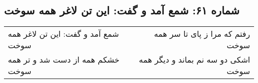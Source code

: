 \begin{center}
\section*{شماره ۶۱: شمع آمد و گفت: این تن لاغر همه سوخت}
\label{sec:061}
\begin{longtable}{l p{0.5cm} r}
شمع آمد و گفت: این تن لاغر همه سوخت
&&
رفتم که مرا ز پای تا سر همه سوخت
\\
خشکم همه از دست شد و تر همه سوخت
&&
اشکی دو سه نم بماند و دیگر همه سوخت
\\
\end{longtable}
\end{center}
